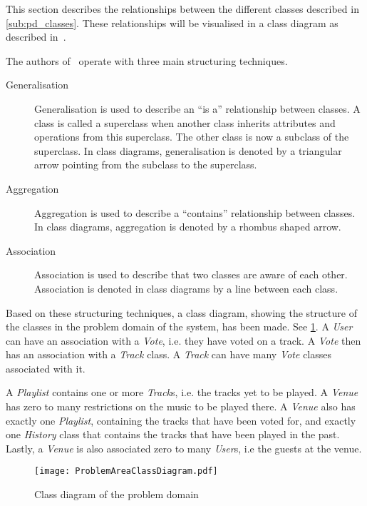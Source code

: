This section describes the relationships between the different classes
described in \cref{sub:pd_classes}. These relationships will be
visualised in a class diagram as described
in~\cite{mathiassen2001objektorienteret}.

The authors of~\cite{mathiassen2001objektorienteret} operate with three
main structuring techniques.

\begin{description}
\item[Generalisation] Generalisation is used to describe an \enquote{is a}
  relationship between classes. A class is called a
  superclass when another class inherits attributes and operations
  from this superclass. The other class is now a subclass of the
  superclass. In class diagrams, generalisation is denoted by a
  triangular arrow pointing from the subclass to the superclass.
\item[Aggregation] Aggregation is used to describe a
  \enquote{contains} relationship between classes. In class diagrams,
  aggregation is denoted by a rhombus shaped arrow.
\item[Association] Association is used to describe that two classes
  are aware of each other. Association is denoted in class diagrams by
  a line between each class.
\end{description}

Based on these structuring techniques, a class diagram, showing the
structure of the classes in the problem domain of the system, has been
made. See \cref{fig:pd_structure}. A \textit{User} can have an
association with a \textit{Vote}, i.e. they have voted on a track. A
\textit{Vote} then has an association with a \textit{Track} class. A
\textit{Track} can have many \textit{Vote} classes associated with
it.

A \textit{Playlist} contains one or more \textit{Track}s, i.e. the
tracks yet to be played. A \textit{Venue} has zero to many
restrictions on the music to be played there. A \textit{Venue} also
has exactly one \textit{Playlist}, containing the tracks that have
been voted for, and exactly one \textit{History} class that contains
the tracks that have been played in the past. Lastly, a \textit{Venue} is also associated zero to
many \textit{User}s, i.e the guests at the venue.

\begin{figure}[htbp]
  \centering
  \texttt{[image: ProblemAreaClassDiagram.pdf]}
  \caption{Class diagram of the problem domain}\label{fig:pd_structure}
\end{figure}
